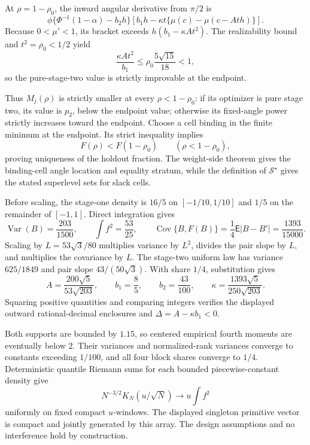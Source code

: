 At \(\rho=1-\rho_0\), the inward angular derivative from \(\pi/2\) is
\[
\phi\{\Phi^{-1}(1-\alpha)-b_2h\}
\left[b_1h-\kappa t\{\mu(c)-\mu(c-Ath)\}\right].
\]
Because \(0<\mu'<1\), its bracket exceeds \(h(b_1-\kappa At^2)\).  The realizability bound and \(t^2=\rho_0<1/2\) yield
\[
\frac{\kappa At^2}{b_1}
\le\rho_0\frac{5\sqrt{15}}{18}<1,
\]
so the pure-stage-two value is strictly improvable at the endpoint.

Thus \(M_j(\rho)\) is strictly smaller at every \(\rho<1-\rho_0\): if its optimizer is pure stage two, its value is \(p_2\), below the endpoint value; otherwise its fixed-angle power strictly increases toward the endpoint.  Choose a cell binding in the finite minimum at the endpoint.  Its strict inequality implies
\[
F(\rho)<F(1-\rho_0)\qquad(\rho<1-\rho_0),
\]
proving uniqueness of the holdout fraction.  The weight-side theorem gives the binding-cell angle location and equality stratum, while the definition of \(\mathcal S^\star\) gives the stated superlevel sets for slack cells.

Before scaling, the stage-one density is \(16/5\) on \([-1/10,1/10]\) and \(1/5\) on the remainder of \([-1,1]\).  Direct integration gives
\[
\operatorname{Var}(B)=\frac{203}{1500},\qquad
\int f^2=\frac{53}{25},\qquad
\operatorname{Cov}\{B,F(B)\}=\frac14\mathsf E|B-B'|=\frac{1393}{15000}.
\]
Scaling by \(L=53\sqrt3/80\) multiplies variance by \(L^2\), divides the pair slope by \(L\), and multiplies the covariance by \(L\).  The stage-two uniform law has variance \(625/1849\) and pair slope \(43/(50\sqrt3)\).  With share \(1/4\), substitution gives
\[
A=\frac{200\sqrt5}{53\sqrt{203}},\qquad
b_1=\frac85,\qquad b_2=\frac{43}{100},\qquad
\kappa=\frac{1393\sqrt5}{250\sqrt{203}}.
\]
Squaring positive quantities and comparing integers verifies the displayed outward rational-decimal enclosures and \(\Delta=A-\kappa b_1<0\).

Both supports are bounded by \(1.15\), so centered empirical fourth moments are eventually below \(2\).  Their variances and normalized-rank variances converge to constants exceeding \(1/100\), and all four block shares converge to \(1/4\).  Deterministic quantile Riemann sums for each bounded piecewise-constant density give
\[
N^{-3/2}K_N(u/\sqrt N)\longrightarrow u\int f^2
\]
uniformly on fixed compact \(u\)-windows.  The displayed singleton primitive vector is compact and jointly generated by this array.  The design assumptions and no interference hold by construction.

